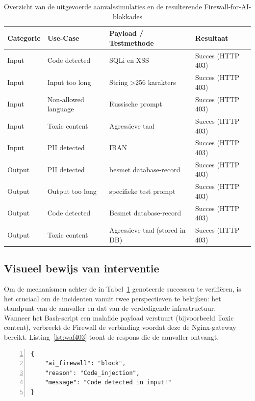 \begin{table}[h]
    \centering
    \caption{Overzicht van de uitgevoerde aanvalssimulaties en de resulterende Firewall-for-AI-blokkades}
    \label{tab:waf-results}
    \begin{tabular}{|l|l|l|l|}
        \hline
        \textbf{Categorie} & \textbf{Use-Case} & \textbf{Payload / Testmethode} & \textbf{Resultaat} \\ \hline
        Input & Code detected & SQLi en XSS & Succes (HTTP 403) \\ \hline
        Input & Input too long & String >256 karakters & Succes (HTTP 403) \\ \hline
        Input & Non-allowed language & Russische prompt & Succes (HTTP 403) \\ \hline
        Input & Toxic content & Agressieve taal & Succes (HTTP 403) \\ \hline
        Input & PII detected & IBAN & Succes (HTTP 403) \\ \hline
        Output & PII detected & besmet database-record & Succes (HTTP 403) \\ \hline 
        Output & Output too long & specifieke test prompt & Succes (HTTP 403) \\ \hline 
        Output & Code detected & Besmet database-record & Succes (HTTP 403) \\ \hline 
        Output& Toxic content & Agressieve taal (stored in DB) & Succes (HTTP 403) \\ \hline 
    \end{tabular}
\end{table}

\subsection{Visueel bewijs van interventie}

Om de mechanismen achter de in Tabel~\ref{tab:waf-results} genoteerde successen te verifiëren, is het cruciaal om de incidenten vanuit twee perspectieven te bekijken: het standpunt van de aanvaller en dat van de verdedigende infrastructuur.\\

Wanneer het Bash-script een malafide payload verstuurt (bijvoorbeeld Toxic content), verbreekt de Firewall de verbinding voordat deze de Nginx-gateway bereikt. Listing~\ref{lst:waf403} toont de respons die de aanvaller ontvangt.

\begin{lstlisting}[language={}, caption={Terminal-output na een WAF-blokkade}, label={lst:waf403}, breaklines=true, numbers=left,frame=singl]
{
    "ai_firewall": "block",
    "reason": "Code_injection",
    "message": "Code detected in input!"
}
\end{lstlisting}

